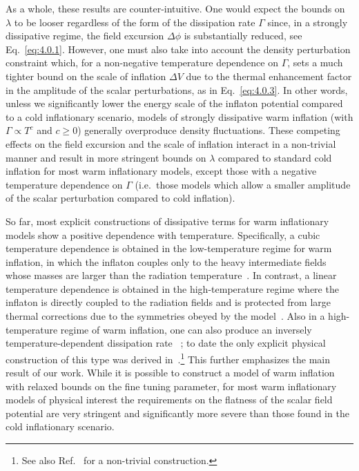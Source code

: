 \documentclass[aps,prd,twocolumn,amssymb,amsmath,floatfix,nofootinbib,superscriptaddress,preprintnumbers]{revtex4-1}
\begin{document}
As a whole, these results are counter-intuitive. One would expect the bounds on $\lambda$ to be looser regardless of the form of the dissipation rate $\Gamma$ since, in a strongly dissipative regime, the field excursion $\Delta\phi$ is substantially reduced, see Eq.~\ref{eq:4.0.1}. However, one must also take into account the density perturbation constraint which, for a non-negative temperature dependence on $\Gamma$, sets a much tighter bound on the scale of inflation $\Delta V$ due to the thermal enhancement factor in the amplitude of the scalar perturbations, as in Eq.~\ref{eq:4.0.3}. In other words, unless we significantly lower the energy scale of the inflaton potential compared to a cold inflationary scenario, models of strongly dissipative warm inflation (with $\Gamma\propto T^c$ and $c\geq 0$) generally overproduce density fluctuations. These competing effects on the field excursion and the scale of inflation interact in a non-trivial manner and result in more stringent bounds on $\lambda$ compared to standard cold inflation for most warm inflationary models, except those with a negative temperature dependence on $\Gamma$ (i.e.\ those models which allow a smaller amplitude of the scalar perturbation compared to cold inflation).

So far, most explicit constructions of dissipative terms for warm inflationary models show a positive dependence with temperature. Specifically, a cubic temperature dependence is obtained in the low-temperature regime for warm inflation, in which the inflaton couples only to the heavy intermediate fields whose masses are larger than the radiation temperature~\cite{Berera:2008ar,Bastero-Gil:2010dgy,Bastero-Gil:2012akf,Berghaus:2019whh,Motaharfar:2018zyb}. In contrast, a linear temperature dependence is obtained in the high-temperature regime where the inflaton is directly coupled to the radiation fields and is protected from large thermal corrections due to the symmetries obeyed by the model~\cite{Bastero-Gil:2016qru,Berghaus:2020ekh,Motaharfar:2018zyb}. Also in a high-temperature regime of warm inflation, one can also produce an inversely temperature-dependent dissipation rate ~\cite{Berera:1998gx, Berera:1998px, Motaharfar:2018zyb}; to date the only explicit physical construction of this type was derived in~\cite{Bastero-Gil:2019gao}.\footnote{See also Ref.~\cite{Haddad:2022} for a non-trivial construction.} This further emphasizes the main result of our work. While it is possible to construct a model of warm inflation with relaxed bounds on the fine tuning parameter, for most warm inflationary models of physical interest the requirements on the flatness of the scalar field potential are very stringent and significantly more severe than those found in the cold inflationary scenario.
\end{document}

